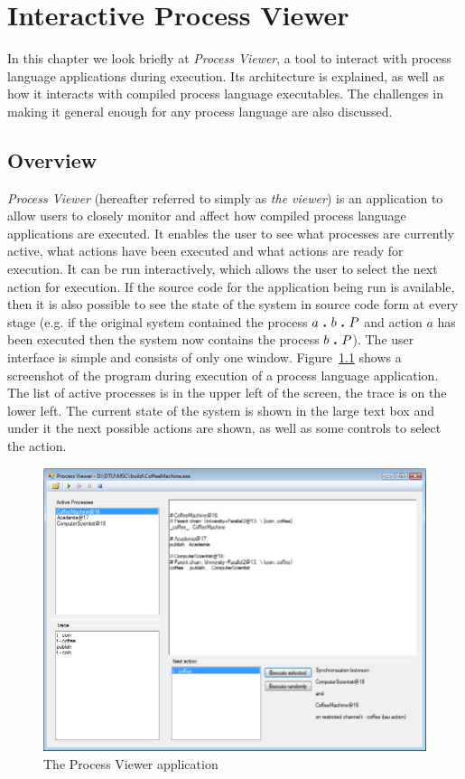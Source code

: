 \chapter{Interactive Process Viewer}\label{ch:process_viewer}

	In this chapter we look briefly at \textit{Process Viewer}, a tool to 
	interact with process language applications during execution. Its 
	architecture is explained, as well as how it interacts with compiled process 
	language executables. The challenges in making it general enough for any 
	process language are also discussed.

\section{Overview}

	\textit{Process Viewer} (hereafter referred to simply as \textit{the viewer})
	is an application to allow users to closely monitor and affect how compiled 
	process language applications are executed. It enables the user to see what 
	processes are currently active, what actions have been executed and what 
	actions are ready for execution. It can be run interactively, which allows 
	the user to select the next action for execution. If the source code for the 
	application being run is available, then it is also possible to see the 
	state of the system in source code form at every stage (e.g. if the original 
	system contained the process $a \ \textbf{.}\  b \ \textbf{.}\  P$ and action $a$ has been 
	executed then the system now contains the process $b \ \textbf{.}\  P$). The user 
	interface is simple and consists of only one window. 
	Figure~\ref{fig:process_viewer} shows a screenshot of the program during 
	execution of a process language application. The list of active processes is 
	in the upper left of the screen, the trace is on the lower left. The current 
	state of the system is shown in the large text box and under it the next 
	possible actions are shown, as well as some controls to select the action.
	
	\begin{figure}[h!]
		\centering
		\includegraphics[scale=0.4]{process_viewer.png}
		\caption{The Process Viewer application}
		\label{fig:process_viewer}
	\end{figure}
	

